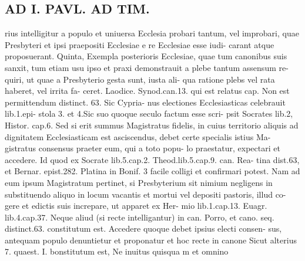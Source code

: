 \documentclass{article}
\begin{document}
\begin{pages}
\section*{AD I. PAVL. AD TIM. }
\marginpar{[ p.113 ]}rius intelligitur a populo et uniuersa Ecclesia probari tantum, vel improbari, quae Presbyteri et ipsi praepositi Ecclesiae e re Ecclesiae esse iudi- carant atque proposuerant. Quinta, Exempla posterioris Ecclesiae, quae tum canonibus suis sanxit, tum etiam usu ipso et praxi demonstrauit a plebe tantum assensum re- quiri, ut quae a Presbyterio gesta sunt, iusta ali- qua ratione plebs vel rata haberet, vel irrita fa- ceret. Laodice. Synod.can.13. qui est relatus cap. Non est permittendum distinct. 63. Sic Cypria- nus electiones Ecclesiasticas celebrauit lib.1.epi- stola 3. et 4.Sic suo quoque seculo factum esse scri- psit Socrates lib.2, Histor. cap.6. Sed si erit summus Magistratus fidelis, in cuius territorio aliquis ad dignitatem Ecclesiasticam est asciscendus, debet certe specialis istius Ma- gistratus consensus praeter eum, qui a toto popu- lo praestatur, expectari et accedere. Id quod ex Socrate lib.5.cap.2. Theod.lib.5.cap.9. can. Rea- tina dist.63, et Bernar. epist.282. Platina in Bonif. 3 facile colligi et confirmari potest. Nam ad eum ipsum Magistratum pertinet, si Presbyterium sit nimium negligens in substituendo aliquo in locum vacantis et mortui vel depositi pastoris, illud co- gere et edictis suis increpare, ut apparet ex Her- mio lib.1.cap.13. Euagr. lib.4.cap.37. Neque aliud (si recte intelligantur) in can. Porro, et cano. seq. distinct.63. constitutum est. Accedere quoque debet ipsius electi consen- sus, antequam populo denuntietur et proponatur et hoc recte in canone Sicut alterius 7. quaest. I. bonstitutum est, Ne inuitus quisqua m et omnino 

\end{pages}
\end{document}
